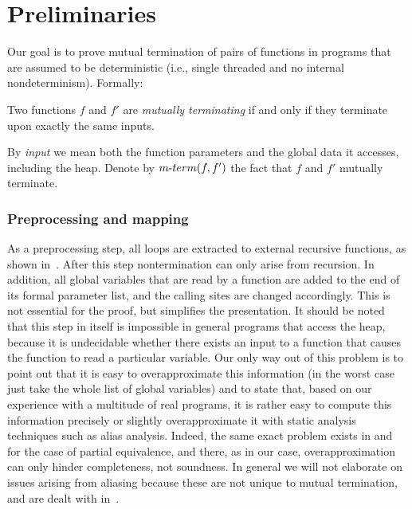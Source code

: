 \section{Preliminaries} \label{sec:base}
Our goal is to prove mutual termination of pairs of functions in programs that are assumed to be deterministic (i.e.,
single threaded and no internal nondeterminism). Formally:

\begin{definition}
\label{def:mt_prog} Two functions $f$ and $f'$  are \emph{mutually
terminating} if and only if they terminate upon exactly the same inputs.
\end{definition}
By \emph{input} we mean both the function parameters and the
global data it accesses, including the heap. 
%
Denote by $m\mbox{-}term(f,f')$ the fact that $f$ and $f'$ mutually terminate.
%
\subsubsection{Preprocessing and mapping}
As a preprocessing step, all loops are extracted to external recursive
functions, as shown in~\cite{G08}. After this step nontermination can only
arise from recursion. In addition, all global variables that are read by a
function are added to the end of its formal parameter list, and the
calling sites are changed accordingly. This is not essential for the
proof, but simplifies the presentation. It should be noted that this step in
itself is impossible in general programs that access the heap, because it is
undecidable whether there exists an input to a function that causes the
function to read a particular variable. Our only way out of this problem is to
point out that it is easy to overapproximate this information (in the worst
case just take the whole list of global variables) and to state that, based on
our experience with a multitude of real programs, it is rather easy to compute
this information precisely or slightly overapproximate it with static analysis
techniques such as alias analysis. Indeed, the same exact problem exists in
 and  for the case of partial equivalence, and there,
as in our case, overapproximation can only hinder completeness, not soundness.
In general we will not elaborate on issues arising from aliasing because these
are not unique to mutual termination, and are dealt with in~\cite{GS09,KLR10}.

